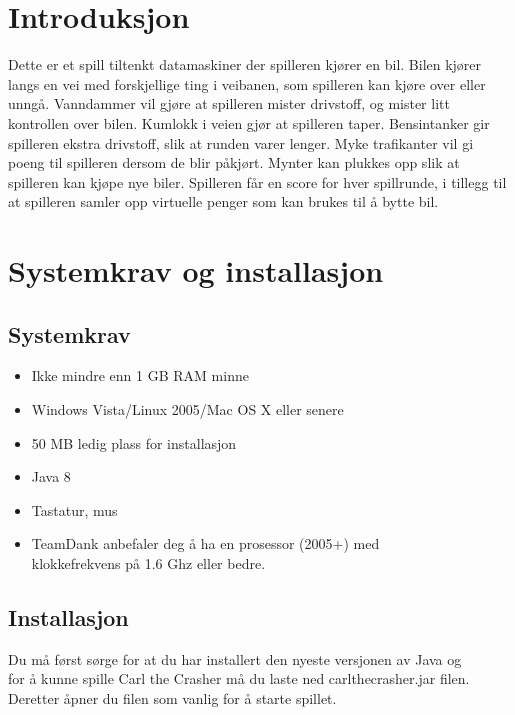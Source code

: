 \documentclass[paper=a4]{article}
\begin{document}
\section{Introduksjon}
Dette er et spill tiltenkt datamaskiner der spilleren kjører en bil.
Bilen kjører langs en vei med forskjellige ting i veibanen, som spilleren kan kjøre over eller unngå.
Vanndammer vil gjøre at spilleren mister drivstoff, og mister litt kontrollen over bilen.
Kumlokk i veien gjør at spilleren taper.
Bensintanker gir spilleren ekstra drivstoff, slik at runden varer lenger.
Myke trafikanter vil gi poeng til spilleren dersom de blir påkjørt.
Mynter kan plukkes opp slik at spilleren kan kjøpe nye biler.
Spilleren får en score for hver spillrunde, i tillegg til at spilleren samler opp virtuelle penger som kan brukes til å bytte bil.
\newpage

\section{Systemkrav og installasjon}
\subsection{Systemkrav}
\begin{itemize}
	\item Ikke mindre enn 1 GB RAM minne\\
	\item Windows Vista/Linux 2005/Mac OS X eller senere \\
	\item 50 MB ledig plass for installasjon \\
	\item Java 8 \\
	\item Tastatur, mus \\
 	\item TeamDank anbefaler deg å ha en prosessor (2005+) med \\ 
klokkefrekvens på 1.6 Ghz eller bedre.
\end{itemize}
\subsection{Installasjon}
Du må først sørge for at du har installert den nyeste versjonen av Java og \\
for å kunne spille Carl the Crasher må du laste ned carlthecrasher.jar filen. \\
Deretter åpner du filen som vanlig for å starte spillet.   
\newpage
\end{document}

